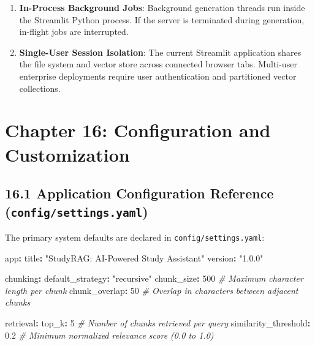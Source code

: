 \documentclass[
]{article}
\newenvironment{Shaded}{}{}
\newcommand{\AttributeTok}[1]{\textcolor[rgb]{0.49,0.56,0.16}{#1}}
\newcommand{\CommentTok}[1]{\textcolor[rgb]{0.38,0.63,0.69}{\textit{#1}}}
\newcommand{\DecValTok}[1]{\textcolor[rgb]{0.25,0.63,0.44}{#1}}
\newcommand{\FloatTok}[1]{\textcolor[rgb]{0.25,0.63,0.44}{#1}}
\newcommand{\FunctionTok}[1]{\textcolor[rgb]{0.02,0.16,0.49}{#1}}
\newcommand{\KeywordTok}[1]{\textcolor[rgb]{0.00,0.44,0.13}{\textbf{#1}}}
\newcommand{\StringTok}[1]{\textcolor[rgb]{0.25,0.44,0.63}{#1}}
\providecommand{\tightlist}{%
  \setlength{\itemsep}{0pt}\setlength{\parskip}{0pt}}
\begin{document}
\begin{enumerate}
\def\labelenumi{\arabic{enumi}.}
\tightlist
\item
  \textbf{In-Process Background Jobs}: Background generation threads run
  inside the Streamlit Python process. If the server is terminated
  during generation, in-flight jobs are interrupted.
\item
  \textbf{Single-User Session Isolation}: The current Streamlit
  application shares the file system and vector store across connected
  browser tabs. Multi-user enterprise deployments require user
  authentication and partitioned vector collections.
\end{enumerate}

\section{Chapter 16: Configuration and
Customization}\label{chapter-16-configuration-and-customization}

\subsection{\texorpdfstring{16.1 Application Configuration Reference
(\texttt{config/\allowbreak settings.\allowbreak yaml})}{16.1 Application Configuration Reference (config/settings.yaml)}}\label{application-configuration-reference-configsettings.yaml}

The primary system defaults are declared in
\texttt{config/\allowbreak settings.\allowbreak yaml}:

\begin{Shaded}
\begin{Highlighting}[]
\FunctionTok{app}\KeywordTok{:}
\AttributeTok{  }\FunctionTok{title}\KeywordTok{:}\AttributeTok{ }\StringTok{"StudyRAG: AI{-}Powered Study Assistant"}
\AttributeTok{  }\FunctionTok{version}\KeywordTok{:}\AttributeTok{ }\StringTok{"1.0.0"}

\FunctionTok{chunking}\KeywordTok{:}
\AttributeTok{  }\FunctionTok{default\_strategy}\KeywordTok{:}\AttributeTok{ }\StringTok{"recursive"}
\AttributeTok{  }\FunctionTok{chunk\_size}\KeywordTok{:}\AttributeTok{ }\DecValTok{500}\CommentTok{              \# Maximum character length per chunk}
\AttributeTok{  }\FunctionTok{chunk\_overlap}\KeywordTok{:}\AttributeTok{ }\DecValTok{50}\CommentTok{            \# Overlap in characters between adjacent chunks}

\FunctionTok{retrieval}\KeywordTok{:}
\AttributeTok{  }\FunctionTok{top\_k}\KeywordTok{:}\AttributeTok{ }\DecValTok{5}\CommentTok{                     \# Number of chunks retrieved per query}
\AttributeTok{  }\FunctionTok{similarity\_threshold}\KeywordTok{:}\AttributeTok{ }\FloatTok{0.2}\CommentTok{    \# Minimum normalized relevance score (0.0 to 1.0)}
\end{Highlighting}
\end{Shaded}
\end{document}
